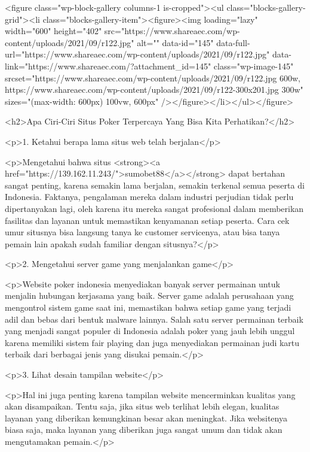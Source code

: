{<figure class="wp-block-gallery columns-1 is-cropped"><ul class="blocks-gallery-grid"><li class="blocks-gallery-item"><figure><img loading="lazy" width="600" height="402" src="https://www.shareaec.com/wp-content/uploads/2021/09/r122.jpg" alt="" data-id="145" data-full-url="https://www.shareaec.com/wp-content/uploads/2021/09/r122.jpg" data-link="https://www.shareaec.com/?attachment_id=145" class="wp-image-145" srcset="https://www.shareaec.com/wp-content/uploads/2021/09/r122.jpg 600w, https://www.shareaec.com/wp-content/uploads/2021/09/r122-300x201.jpg 300w" sizes="(max-width: 600px) 100vw, 600px" /></figure></li></ul></figure>



<h2>Apa Ciri-Ciri Situs Poker Terpercaya Yang Bisa Kita Perhatikan?</h2>



<p>1. Ketahui berapa lama situs web telah berjalan</p>



<p>Mengetahui bahwa situs <strong><a href="https://139.162.11.243/">sumobet88</a></strong> dapat bertahan sangat penting, karena semakin lama berjalan, semakin terkenal semua peserta di Indonesia. Faktanya, pengalaman mereka dalam industri perjudian tidak perlu dipertanyakan lagi, oleh karena itu mereka sangat profesional dalam memberikan fasilitas dan layanan untuk memastikan kenyamanan setiap peserta. Cara cek umur situsnya bisa langsung tanya ke customer servicenya, atau bisa tanya pemain lain apakah sudah familiar dengan situsnya?</p>



<p>2. Mengetahui server game yang menjalankan game</p>



<p>Website poker indonesia menyediakan banyak server permainan untuk menjalin hubungan kerjasama yang baik. Server game adalah perusahaan yang mengontrol sistem game saat ini, memastikan bahwa setiap game yang terjadi adil dan bebas dari bentuk malware lainnya. Salah satu server permainan terbaik yang menjadi sangat populer di Indonesia adalah poker yang jauh lebih unggul karena memiliki sistem fair playing dan juga menyediakan permainan judi kartu terbaik dari berbagai jenis yang disukai pemain.</p>



<p>3. Lihat desain tampilan website</p>



<p>Hal ini juga penting karena tampilan website mencerminkan kualitas yang akan disampaikan. Tentu saja, jika situs web terlihat lebih elegan, kualitas layanan yang diberikan kemungkinan besar akan meningkat. Jika websitenya biasa saja, maka layanan yang diberikan juga sangat umum dan tidak akan mengutamakan pemain.</p>



}
